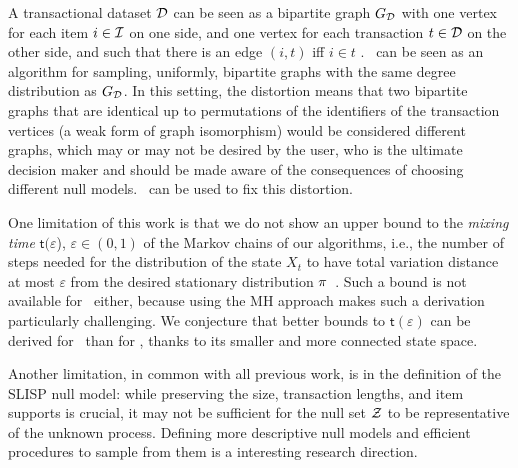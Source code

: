 A transactional dataset $\mathcal{D}$ can be seen as a bipartite graph $G_{\mathcal{D}}$
with one vertex for each item $i \in \mathcal{I}$ on one side, and one vertex for
each transaction $t \in \mathcal{D}$ on the other side, and such that there is an
edge $(i,t)$ iff $i \in t$ \citep[Sect.\ 4.1]{GionisMMT07}. \gioalgo\ can be
seen as an algorithm for sampling, uniformly, bipartite graphs with the same
degree distribution as $G_{\mathcal{D}}$. In this setting, the distortion means that
two bipartite graphs that are identical up to permutations of the identifiers of
the transaction vertices (a weak form of graph isomorphism) would be considered
different graphs, which may or may not be desired by the user, who is the
ultimate decision maker and should be made aware of the consequences of choosing
different null models. \algo\ can be used to fix this distortion.

One limitation of this work is that we do not show an upper bound to the
\emph{mixing time} $\mathsf{t}(\varepsilon$), $\varepsilon \in (0,1)$ of the
Markov chains of our algorithms, i.e., the number of steps needed for the
distribution of the state $X_t$ to have total variation distance at most
$\varepsilon$ from the desired stationary distribution
$\pi$~\citep[Ch.\ 10]{MitzenmacherU05}. Such a bound is not available for
\gioalgo\ either, because using the MH approach makes such a derivation
particularly challenging. We conjecture that better bounds to
$\mathsf{t}(\varepsilon)$ can be derived for \ than for \naivealgo,
thanks to its smaller and more connected state space.

Another limitation, in common with all previous work, is in the definition of
the SLISP null model: while preserving the size, transaction lengths, and item
supports is crucial, it may not be sufficient for the null set $\mathcal{Z}$ to be
representative of the unknown process. Defining more descriptive null models and
efficient procedures to sample from them is a interesting research direction.
